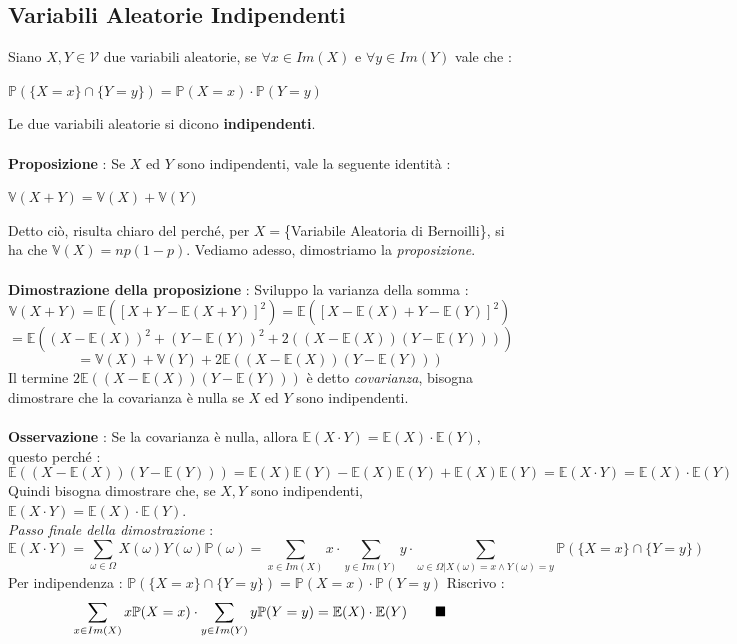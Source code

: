 \documentclass[12pt, letterpaper]{article}
\newcommand{\E}{{\mathbb E}}
\newcommand{\V}{{\mathbb V}}
\newcommand{\Prob}{{\mathbb P}}
\begin{document}
\subsection{Variabili Aleatorie Indipendenti}
Siano \(X,Y\in\mathcal{V}\) due variabili aleatorie, se \(\forall x\in Im(X)\) e \(\forall y\in Im(Y)\) vale che :
\begin{center}
    \(
      \Prob(\{X=x\}\cap\{Y=y\})=\Prob(X=x)\cdot\Prob(Y=y)  
    \)
\end{center}
Le due variabili aleatorie si dicono \textbf{indipendenti}.\\\hphantom{}\\
\textbf{Proposizione} : Se \(X\) ed \(Y\) sono indipendenti, vale la seguente identità :\begin{center}
    \(\V(X+Y)=\V(X)+\V(Y)\)
\end{center}
Detto ciò, risulta chiaro del perché, per \(X=\)\{Variabile Aleatoria di Bernoilli\}, si ha che \(\V(X)=np(1-p)\).
Vediamo adesso, dimostriamo la \textit{proposizione}.\\\hphantom{}\\
\textbf{Dimostrazione della proposizione} : Sviluppo la varianza della somma :
\begin{equation}
    \V(X+Y)=\E([X+Y-\E(X+Y)]^2)=\E([X-\E(X)+Y-\E(Y)]^2)
\end{equation}
\begin{equation}
    = \E((X-\E(X))^2+(Y-\E(Y))^2+2((X-\E(X))(Y-\E(Y))))
\end{equation}
\begin{equation}
    =\V(X)+\V(Y)+2\E((X-\E(X))(Y-\E(Y)))
\end{equation}
Il termine \(2\E((X-\E(X))(Y-\E(Y)))\) è detto \textit{covarianza}, bisogna dimostrare che la covarianza è 
nulla se \(X\) ed \(Y\) sono indipendenti.\\\hphantom{}\\
\textbf{Osservazione} : Se la covarianza è nulla, allora \(\E(X\cdot Y)=\E(X)\cdot\E(Y)\), questo perché :\begin{equation}
    \E((X-\E(X))(Y-\E(Y)))=\E(X)\E(Y)-\E(X)\E(Y)+\E(X)\E(Y)=\E(X\cdot Y)=\E(X)\cdot\E(Y) 
\end{equation}
Quindi bisogna dimostrare che, se \(X,Y\) sono indipendenti, \(\E(X\cdot Y)=\E(X)\cdot\E(Y) \).
\\\textit{Passo finale della dimostrazione} : \begin{equation}
    \E(X\cdot Y)=\sum_{\omega\in \Omega}X(\omega)Y(\omega)\Prob({\omega})=
    \sum_{x\in Im(X)}x\cdot\sum_{y\in Im(Y)}y\cdot\sum_{
        \omega\in\Omega|X(\omega)=x\land Y(\omega)=y
    }\Prob(\{X=x\}\cap\{Y=y\})
\end{equation}
Per indipendenza :  \(
    \Prob(\{X=x\}\cap\{Y=y\})=\Prob(X=x)\cdot\Prob(Y=y)  
  \)
  Riscrivo :
  \begin{equation}
    \sum_{x\in Im(X)}x\Prob(X=x)\cdot\sum_{y\in Im(Y)}y\Prob(Y=y)=\E(X)\cdot\E(Y)\text{\hphantom{aaaa}}\blacksquare
  \end{equation}
 
\end{document}
